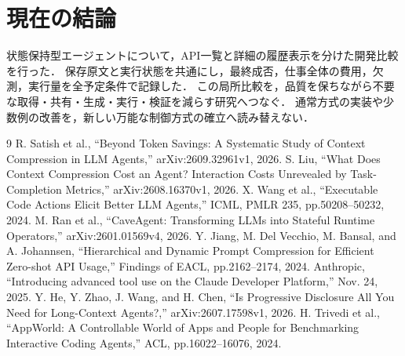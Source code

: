 \documentclass[uplatex,a4paper,twocolumn,10pt]{jsarticle}
\begin{document}
\section{現在の結論}
状態保持型エージェントについて，API一覧と詳細の履歴表示を分けた開発比較を行った．
保存原文と実行状態を共通にし，最終成否，仕事全体の費用，欠測，実行量を全予定条件で記録した．
この局所比較を，品質を保ちながら不要な取得・共有・生成・実行・検証を減らす研究へつなぐ．
通常方式の実装や少数例の改善を，新しい万能な制御方式の確立へ読み替えない．

\begin{thebibliography}{9}\small
{} R. Satish et al., ``Beyond Token Savings: A Systematic Study of Context Compression in LLM Agents,'' arXiv:2609.32961v1, 2026.
 S. Liu, ``What Does Context Compression Cost an Agent? Interaction Costs Unrevealed by Task-Completion Metrics,'' arXiv:2608.16370v1, 2026.
 X. Wang et al., ``Executable Code Actions Elicit Better LLM Agents,'' ICML, PMLR 235, pp.50208--50232, 2024.
 M. Ran et al., ``CaveAgent: Transforming LLMs into Stateful Runtime Operators,'' arXiv:2601.01569v4, 2026.
 Y. Jiang, M. Del Vecchio, M. Bansal, and A. Johannsen, ``Hierarchical and Dynamic Prompt Compression for Efficient Zero-shot API Usage,'' Findings of EACL, pp.2162--2174, 2024.
 Anthropic, ``Introducing advanced tool use on the Claude Developer Platform,'' Nov. 24, 2025.
 Y. He, Y. Zhao, J. Wang, and H. Chen, ``Is Progressive Disclosure All You Need for Long-Context Agents?,'' arXiv:2607.17598v1, 2026.
 H. Trivedi et al., ``AppWorld: A Controllable World of Apps and People for Benchmarking Interactive Coding Agents,'' ACL, pp.16022--16076, 2024.
\end{thebibliography}
\end{document}
